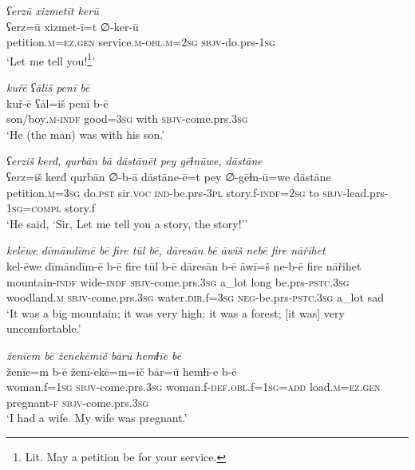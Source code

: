 \ea \label{ZQ.1}
\textit{ʕerzū xizmetīt kerū} \\ 
\gll ʕerz=ū xizmet-ī=t ∅-ker-ū \\ 
 petition\textsc{.m}\textsc{=ez.gen} service\textsc{.m}\textsc{-obl}\textsc{.m}\textsc{=\textsc{2sg}} \textsc{sbjv-}do.prs\textsc{-\textsc{1sg}} \\ 
\glt `Let me tell you!\footnote{Lit. May a petition be for your service.}'
\z 
 
\ea \label{ZQ.3}
\textit{kuřē ʕāliš penī bē} \\ 
\gll kuř-ē ʕāl=iš penī b-ē \\ 
 son/boy\textsc{.m}\textsc{-indf} good\textsc{=3sg} with \textsc{sbjv-}come.prs\textsc{.3sg} \\ 
\glt `He (the man) was with his son.'
\z 
 
\ea \label{ZQ.7}
\textit{ʕerziš kerđ, qurbān bā dāstānēt pey gēɫnūwe, dāstāne} \\ 
\gll ʕerz=iš kerđ qurbān ∅-b-ā dāstāne-ē=t pey ∅-gēɫn-ū=we dāstāne \\ 
 petition\textsc{.m}\textsc{=3sg} do\textsc{.pst} sir.\textsc{voc} \textsc{ind-}be.prs\textsc{-3pl} story.f\textsc{-indf}\textsc{=\textsc{2sg}} to \textsc{sbjv-}lead.prs\textsc{-\textsc{1sg}}\textsc{=compl} story.f \\ 
\glt `He said, ‘Sir, Let me tell you a story, the story!’'
\z 
 
\ea \label{ZQ.12}
\textit{kelēwe dīmāndīmē bē fire tūl bē, dāresān bē āwīš nebē fire nāřihet} \\ 
\gll kel-ēwe dīmāndīm-ē b-ē fire tūl b-ē dāresān b-ē āwī=š ne-b-ē fire nāřihet \\ 
 mountain\textsc{-indf} wide\textsc{-indf} \textsc{sbjv-}come.prs\textsc{.3sg} a\_lot long be.prs\textsc{-pstc}\textsc{.3sg} woodland\textsc{.m} \textsc{sbjv-}come.prs\textsc{.3sg} water\textsc{.dir}.f\textsc{=3sg} \textsc{neg-}be.prs\textsc{-pstc}\textsc{.3sg} a\_lot sad \\ 
\glt `It was a big mountain; it was very high; it was a forest; [it was] very uncomfortable.'
\z 
 
\ea \label{ZQ.13}
\textit{ženīem bē ženekēmīč bārū hemɫīe bē} \\ 
\gll ženīe=m b-ē ženī-ekē=m=īč bār=ū hemɫī-e b-ē \\ 
 woman.f\textsc{=\textsc{1sg}} \textsc{sbjv-}come.prs\textsc{.3sg} woman.f\textsc{-def}\textsc{.obl}.f\textsc{=\textsc{1sg}}\textsc{=add} load\textsc{.m}\textsc{=ez.gen} pregnant\textsc{-f} \textsc{sbjv-}come.prs\textsc{.3sg} \\ 
\glt `I had a wife. My wife was pregnant.'
\z 
 
